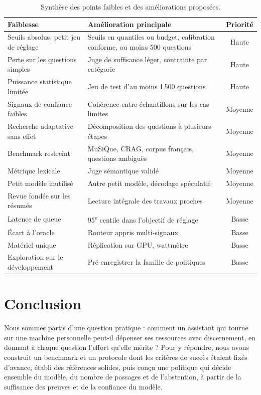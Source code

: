 \documentclass[11pt,a4paper]{article}
\begin{document}
\begin{table}[H]
\centering\small
\begin{tabularx}{\linewidth}{Y Y c}
\toprule
Faiblesse & Amélioration principale & Priorité \\
\midrule
Seuils absolus, petit jeu de réglage & Seuils en quantiles ou budget, calibration conforme, au moins 500 questions & Haute \\
Perte sur les questions simples & Juge de suffisance léger, contrainte par catégorie & Haute \\
Puissance statistique limitée & Jeu de test d'au moins 1\,500 questions & Haute \\
Signaux de confiance faibles & Cohérence entre échantillons sur les cas limites & Moyenne \\
Recherche adaptative sans effet & Décomposition des questions à plusieurs étapes & Moyenne \\
Benchmark restreint & MuSiQue, CRAG, corpus français, questions ambiguës & Moyenne \\
Métrique lexicale & Juge sémantique validé & Moyenne \\
Petit modèle inutilisé & Autre petit modèle, décodage spéculatif & Moyenne \\
Revue fondée sur les résumés & Lecture intégrale des travaux proches & Moyenne \\
Latence de queue & 95\textsuperscript{e} centile dans l'objectif de réglage & Basse \\
Écart à l'oracle & Routeur appris multi-signaux & Basse \\
Matériel unique & Réplication sur GPU, wattmètre & Basse \\
Exploration sur le développement & Pré-enregistrer la famille de politiques & Basse \\
\bottomrule
\end{tabularx}
\caption{Synthèse des points faibles et des améliorations proposées.}
\label{tab:faiblesses}
\end{table}

\section{Conclusion}\label{sec:conclusion}

Nous sommes partis d'une question pratique : comment un assistant qui tourne sur une machine
personnelle peut-il dépenser ses ressources avec discernement, en donnant à chaque question l'effort
qu'elle mérite ? Pour y répondre, nous avons construit un benchmark et un protocole dont les critères de
succès étaient fixés d'avance, établi des références solides, puis conçu une politique qui décide
ensemble du modèle, du nombre de passages et de l'abstention, à partir de la suffisance des preuves et
de la confiance du modèle.
\end{document}
